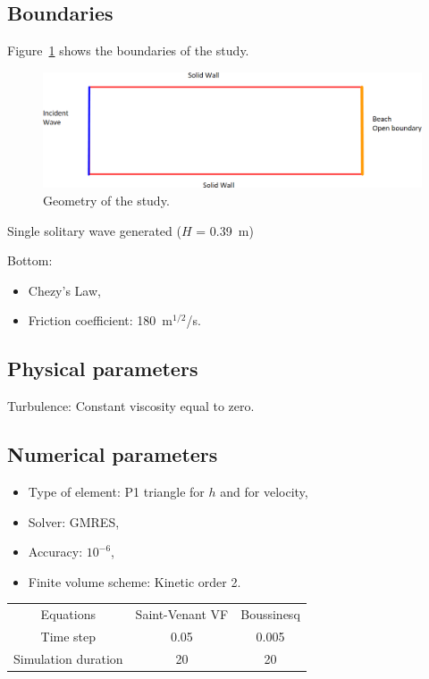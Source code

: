 \subsection{Boundaries}

Figure~\ref{fig:triang:boundaries} shows the boundaries of the study.

\begin{figure}[H]
\centering
\includegraphics[width=.6\textwidth]{img/boundaries.png}
\caption{Geometry of the study.}
\label{fig:triang:boundaries}
\end{figure}

Single solitary wave generated ($H$ = 0.39~m)

Bottom:
\begin{itemize}
  \item Chezy's Law,
  \item Friction coefficient: 180~m$^{1/2}$/s.
\end{itemize}

\subsection{Physical parameters}

Turbulence: Constant viscosity equal to zero.

\subsection{Numerical parameters}

\begin{itemize}
  \item Type of element: P1 triangle for $h$ and for velocity,
  \item Solver: GMRES,
  \item Accuracy: $10^{-6}$,
  \item Finite volume scheme: Kinetic order 2.
\end{itemize}

\begin{table}[H]
  \begin{center}

    \begin{tabular*}{.9\textwidth}{|c|c|c|}
  \hline
  Equations & Saint-Venant VF & Boussinesq \\
  Time step & 0.05 & 0.005 \\
  Simulation duration & 20 & 20 \\
  \hline
\end{tabular*}
  \end{center}
\end{table}

